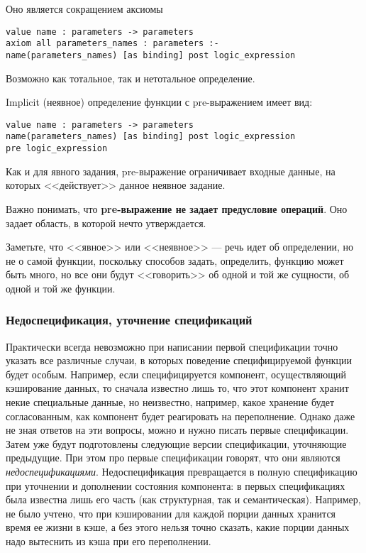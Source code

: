\documentclass[14pt, twoside]{extreport}
\newcommand{\head}[1]{\vspace{1cm}\subsubsection*{#1}}
\begin{document}
Оно является сокращением аксиомы
\begin{lstlisting}
value name : parameters -> parameters
axiom all parameters_names : parameters :-
name(parameters_names) [as binding] post logic_expression
\end{lstlisting}

Возможно как тотальное, так и нетотальное определение.

Implicit (неявное) определение функции с pre-выражением имеет вид:
\begin{lstlisting}
value name : parameters -> parameters
name(parameters_names) [as binding] post logic_expression
pre logic_expression
\end{lstlisting}

Как и для явного задания, pre-выражение ограничивает входные данные, на которых <<действует>> данное неявное задание.

Важно понимать, что \textbf{pre-выражение не задает предусловие операций}. Оно задает область, в которой нечто утверждается.

Заметьте, что <<явное>> или <<неявное>> --- речь идет об определении, но не о самой функции, поскольку способов задать, определить, функцию может быть много, но все они будут <<говорить>> об одной и той же сущности, об одной и той же функции.


\head{Недоспецификация, уточнение спецификаций}

Практически всегда невозможно при написании первой спецификации точно указать все различные случаи, в которых поведение специфицируемой функции будет особым. Например, если специфицируется компонент, осуществляющий кэширование данных, то сначала известно лишь то, что этот компонент хранит некие специальные данные, но неизвестно, например, какое хранение будет согласованным, как компонент будет реагировать на переполнение. Однако даже не зная ответов на эти вопросы, можно и нужно писать первые спецификации. Затем уже будут подготовлены следующие версии спецификации, уточняющие предыдущие. При этом про первые спецификации говорят, что они являются \emph{недоспецификациями}. Недоспецификация превращается в полную спецификацию при уточнении и дополнении состояния компонента: в первых спецификациях была известна лишь его часть (как структурная, так и семантическая). Например, не было учтено, что при кэшировании для каждой порции данных хранится время ее жизни в кэше, а без этого нельзя точно сказать, какие порции данных надо вытеснить из кэша при его переполнении.
\end{document}
